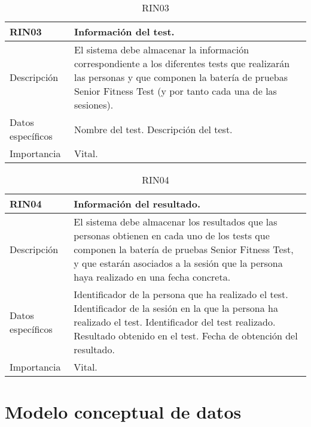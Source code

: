 \begin{table}[H]
\label{RIN03}
\begin{center}
\begin{tabular}{| l | p{10cm} |}
\hline
RIN03 & Información del test.\\
\hline
Descripción & El sistema debe almacenar la información correspondiente a los diferentes tests que realizarán las personas y que componen la batería de pruebas Senior Fitness Test (y por tanto cada una de las sesiones).\\
\hline
Datos específicos & Nombre del test.
\newline Descripción del test.\\
\hline
Importancia & Vital.\\
\hline
\end{tabular}
\end{center}
\caption{RIN03}
\end{table} 

\begin{table}[H]
\label{RIN04}
\begin{center}
\begin{tabular}{| l | p{10cm} |}
\hline
RIN04 & Información del resultado.\\
\hline
Descripción & El sistema debe almacenar los resultados que las personas obtienen en cada uno de los tests que componen la batería de pruebas Senior Fitness Test, y que estarán asociados a la sesión que la persona haya realizado en una fecha concreta.\\
\hline
Datos específicos & Identificador de la persona que ha realizado el test.
\newline Identificador de la sesión en la que la persona ha realizado el test.
\newline Identificador del test realizado.
\newline Resultado obtenido en el test.
\newline Fecha de obtención del resultado.\\
\hline
Importancia & Vital.\\
\hline
\end{tabular}
\end{center}
\caption{RIN04}
\end{table} 

\section{Modelo conceptual de datos}

